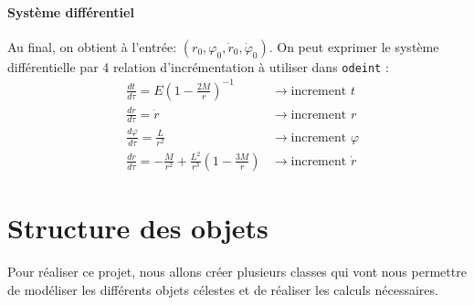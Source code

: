 \documentclass{article}
\begin{document}
\paragraph{Système différentiel} 
Au final, on obtient à l'entrée: $(r_0,\varphi_0,\dot r_0, \dot \varphi_0)$. On peut exprimer le système différentielle par 4 relation d'incrémentation à utiliser dans \texttt{odeint} : 
\begin{align*}
&\frac{dt}{d\tau}=E\left(1-\frac{2M}{r}\right)^{-1}&\to\text{increment } t\\
&\frac{dr}{d\tau}=\dot r&\to\text{increment } r\\
&\frac{d\varphi}{d\tau}=\frac{L}{r^2}&\to\text{increment }\varphi\\
&\frac{d\dot r}{d\tau}=-\frac{M}{r^2}+\frac{L^2}{r^3}\left(1-\frac{3M}{r}\right)&\to\text{increment } \dot r
\end{align*}


\section{Structure des objets}

Pour réaliser ce projet, nous allons créer plusieurs classes qui vont nous permettre de modéliser les différents objets célestes et de réaliser les calculs nécessaires.
\end{document}

